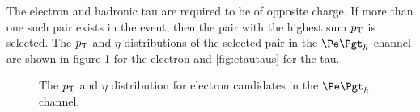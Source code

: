 The electron and hadronic tau are required to be of opposite charge. If more
than one such pair exists in the event, then the pair with the highest sum $p_{\mathrm{T}}$
is selected. The $p_{\mathrm{T}}$ and $\eta$ distributions of the selected pair in the
$\etau$ channel are shown in figure \ref{fig:etauelectrons} for the electron and
\ref{fig:etautaus} for the tau. 


\begin{figure}[htb]
\begin{center}

\end{center}
\caption{
The $p_{\mathrm{T}}$ and $\eta$ distribution for electron candidates in the $\etau$
channel.
}
\label{fig:etauelectrons}
\end{figure}


